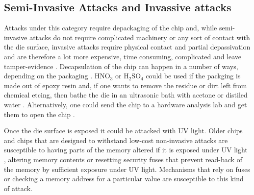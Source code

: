 	\subsection{Semi-Invasive Attacks and Invassive attacks}
	Attacks under this category require depackaging of the chip and, while semi-invasive attacks do not require complicated machinery or any sort of contact with the die surface, invasive attacks require physical contact and partial depassivation and are therefore a lot more expensive, time consuming, complicated and leave tamper-evidence \citep{sergei:thesis} \citep{gutman:memory_remanence}. Decapsulation of the chip can happen in a number of ways, depending on the packaging \citep{hwre} \citep{ic_decap}. HNO$_3$ or H$_2$SO$_4$ could be used if the packging is made out of epoxy resin and, if one wants to remove the residue or dirt left from chemical etcing, then bathe the die in an ultrasonic bath with acetone or distiled water \citep{sergei:thesis} \citep{hwre} \citep{ic_decap}. Alternatively, one could send the chip to a hardware analysis lab and get them to open the chip \citep{website:hacking_the_pic}. 
	
	Once the die surface is exposed it could be attacked with UV light. Older chips and chips that are designed to withstand low-cost non-invasive attacks are susceptible to having parts of the memory altered if it is exposed under UV light \citep{sergei:thesis} \citep{hwre}, altering memory contents or resetting security fuses that prevent read-back of the memory by sufficient exposure under UV light. Mechanisms that rely on fuses or checking a memory address for a particular value are susceptible to this kind of attack.

